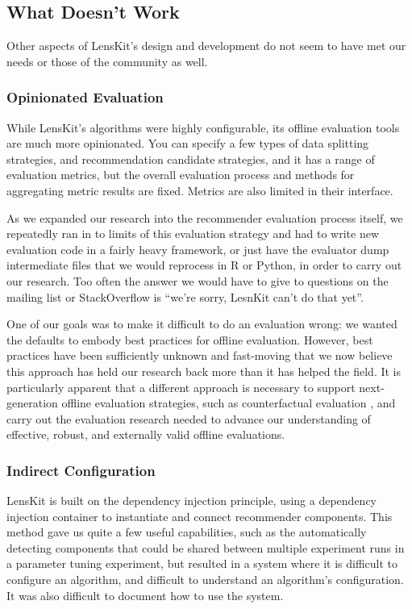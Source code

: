 \subsection{What Doesn't Work}

Other aspects of LensKit's design and development do not seem to have met our needs or those of the community as well.

\subsubsection{Opinionated Evaluation}
While LensKit's algorithms were highly configurable, its offline evaluation tools are much more opinionated.
You can specify a few types of data splitting strategies, and recommendation candidate strategies, and it has a range of evaluation metrics, but the overall evaluation process and methods for aggregating metric results are fixed.
Metrics are also limited in their interface.

As we expanded our research into the recommender evaluation process itself, we repeatedly ran in to limits of this evaluation strategy and had to write new evaluation code in a fairly heavy framework, or just have the evaluator dump intermediate files that we would reprocess in R or Python, in order to carry out our research.
Too often the answer we would have to give to questions on the mailing list or StackOverflow is ``we're sorry, LesnKit can't do that yet''.

One of our goals was to make it difficult to do an evaluation wrong: we wanted the defaults to embody best practices for offline evaluation.
However, best practices have been sufficiently unknown and fast-moving that we now believe this approach has held our research back more than it has helped the field.
It is particularly apparent that a different approach is necessary to support next-generation offline evaluation strategies, such as counterfactual evaluation \citep{Bottou2013-mn}, and carry out the evaluation research needed to advance our understanding of effective, robust, and externally valid offline evaluations.

\subsubsection{Indirect Configuration}

LensKit is built on the dependency injection principle, using a dependency injection container \citep{Ekstrand2016-dl} to instantiate and connect recommender components.
This method gave us quite a few useful capabilities, such as the automatically detecting components that could be shared between multiple experiment runs in a parameter tuning experiment, but resulted in a system where it is difficult to configure an algorithm, and difficult to understand an algorithm's configuration.
It was also difficult to document how to use the system.

